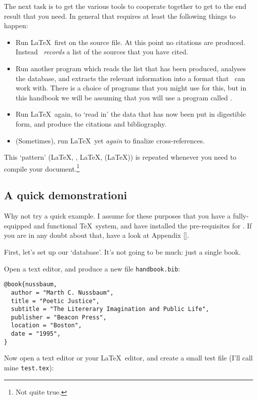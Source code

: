 The next task is to get the various tools to cooperate together to get to the end result that you need. In general that requires at least the following things to happen:
\begin{itemize}
\item Run \LaTeX\ first on the source file. At this point no citations are produced. Instead \biblatex\ \emph{records} a list of the sources that you have cited.
\item Run another program which reads the list that has been produced, analyses the database, and extracts the relevant information into a format that \biblatex\ can work with. There is a choice of programs that you might use for this, but in this handbook we will be assuming that you will use a program called .
\item Run \LaTeX\ again, to `read in' the data that has now been put in digestible form, and produce the citations and bibliography.
\item (Sometimes), run \LaTeX\ yet \emph{again} to finalize cross-references.
\end{itemize}

This `pattern' (\LaTeX, , \LaTeX, (\LaTeX)) is repeated whenever you need to compile your document.\footnote{Not quite true.}

\subsection{A quick demonstrationi\label{neophyte:example}}

Why not try a quick example. I assume for these purposes that you have a fully-equipped and functional \TeX\ system, and have installed the pre-requisites for \biblatex. If you are in any doubt about that, have a look at Appendix [].

First, let's set up our `database'. It's not going to be much: just a single book.

Open a text editor, and produce a new file \texttt{handbook.bib}:
\begin{verbatim}
@book{nussbaum,
  author = "Marth C. Nussbaum",
  title = "Poetic Justice",
  subtitle = "The Litererary Imagination and Public Life",
  publisher = "Beacon Press",
  location = "Boston",
  date = "1995",
}
\end{verbatim}

Now open a text editor or your \LaTeX\ editor, and create a small test file (I'll call mine \texttt{test.tex}):

